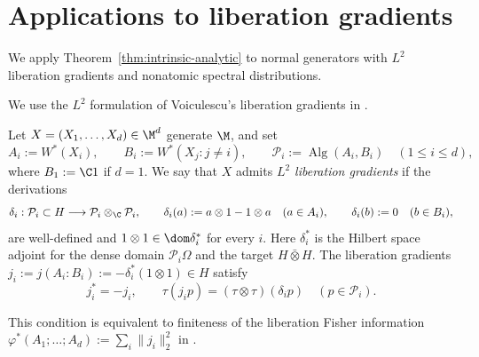 \section{Applications to liberation gradients}
\label{sec:liberation-gradients}

We apply Theorem~\ref{thm:intrinsic-analytic} to normal generators with $L^2$ liberation gradients and nonatomic spectral distributions.

We use the $L^2$ formulation of Voiculescu's liberation gradients in \cite[5.3--5.4 and Proposition~6.1]{Voi99}.
\begin{definition}\label{def:liberation-gradients}
Let $X=(X_1,\ldots,X_d)\in\M^d$ generate $\M$, and set
\[
 A_i:=W^*(X_i),\qquad B_i:=W^*(X_j:j\ne i),\qquad
 \mathcal P_i:=\operatorname{Alg}(A_i,B_i)
 \quad(1\leq i\leq d),
\]
where $B_1:=\C1$ if $d=1$.
We say that $X$ admits \emph{$L^2$ liberation gradients} if the derivations
\[
 \delta_i:\mathcal P_i\subset H\longrightarrow
          \mathcal P_i\otimes_{\C}\mathcal P_i,\qquad
 \delta_i(a):=a\otimes1-1\otimes a\quad(a\in A_i),\qquad
 \delta_i(b):=0\quad(b\in B_i),
\]
are well-defined and $1\otimes1\in\dom\delta_i^*$ for every $i$.
Here $\delta_i^*$ is the Hilbert space adjoint for the dense domain $\mathcal P_i\Omega$ and the target $H\bar\otimes H$.
The liberation gradients $j_i:=j(A_i:B_i):=-\delta_i^*(1\otimes1)\in H$ satisfy
\[
 j_i^*=-j_i,\qquad
 \tau(j_ip)=(\tau\otimes\tau)(\delta_ip)
 \quad(p\in\mathcal P_i).
\]
\end{definition}
This condition is equivalent to finiteness of the liberation Fisher information
$\varphi^*(A_1;\ldots;A_d):=\sum_i\|j_i\|_2^2$ in \cite[Definition~9.1]{Voi99}.

